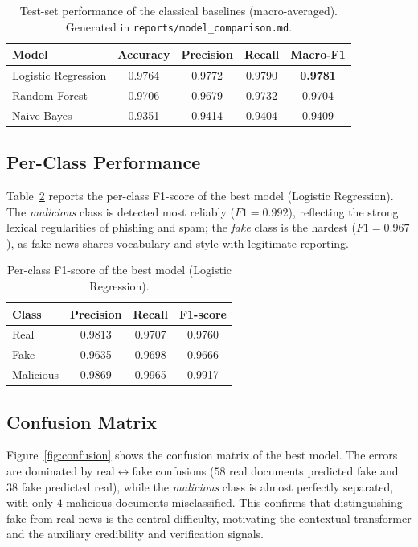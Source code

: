 \begin{table}[t]
  \centering
  \caption{Test-set performance of the classical baselines (macro-averaged).
  Generated in \texttt{reports/model\_comparison.md}.}
  \label{tab:comparison}
  \begin{tabular}{lcccc}
    \hline
    \textbf{Model} & \textbf{Accuracy} & \textbf{Precision} & \textbf{Recall} & \textbf{Macro-F1} \\
    \hline
    Logistic Regression & 0.9764 & 0.9772 & 0.9790 & \textbf{0.9781} \\
    Random Forest       & 0.9706 & 0.9679 & 0.9732 & 0.9704 \\
    Naive Bayes         & 0.9351 & 0.9414 & 0.9404 & 0.9409 \\
    \hline
    \hline
  \end{tabular}
\end{table}

\subsection{Per-Class Performance}
Table~\ref{tab:perclass} reports the per-class F1-score of the best model
(Logistic Regression). The \emph{malicious} class is detected most reliably
($F1 = 0.992$), reflecting the strong lexical regularities of phishing and spam;
the \emph{fake} class is the hardest ($F1 = 0.967$), as fake news shares
vocabulary and style with legitimate reporting.

\begin{table}[t]
  \centering
  \caption{Per-class F1-score of the best model (Logistic Regression).}
  \label{tab:perclass}
  \begin{tabular}{lccc}
    \hline
    \textbf{Class} & \textbf{Precision} & \textbf{Recall} & \textbf{F1-score} \\
    \hline
    Real      & 0.9813 & 0.9707 & 0.9760 \\
    Fake      & 0.9635 & 0.9698 & 0.9666 \\
    Malicious & 0.9869 & 0.9965 & 0.9917 \\
    \hline
  \end{tabular}
\end{table}

\subsection{Confusion Matrix}
Figure~\ref{fig:confusion} shows the confusion matrix of the best model. The
errors are dominated by real$\leftrightarrow$fake confusions ($58$ real
documents predicted fake and $38$ fake predicted real), while the
\emph{malicious} class is almost perfectly separated, with only $4$ malicious
documents misclassified. This confirms that distinguishing fake from real news is
the central difficulty, motivating the contextual transformer and the auxiliary
credibility and verification signals.

